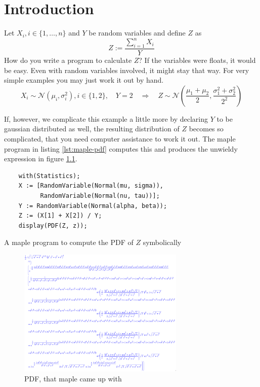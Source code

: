 \documentclass[11pt,a4paper]{book}
\begin{document}
\cleardoublepage

\tableofcontents

\cleardoublepage

\mainmatter
\pagestyle{fancy}

\chapter{Introduction}

Let $X_{i}, i \in \{ 1, \dots, n \}$ and $Y$ be random variables and define $Z$ as
\begin{equation*}
  Z := \frac{\sum_{i = 1}^{n} X_{i}}{Y}
\end{equation*}
How do you write a program to calculate $Z$? If the variables were floats, it
would be easy. Even with random variables involved, it might stay that way. For
very simple examples you may just work it out by hand.
\begin{equation*}
  X_{i} \sim \mathcal{N}(\mu_{i}, \sigma_{i}^{2}), i \in \{ 1, 2 \}, \quad Y = 2 \quad \Rightarrow \quad Z \sim \mathcal{N}\left( \frac{\mu_{1} + \mu_{2}}{2}, \frac{\sigma_{1}^{2} + \sigma_{2}^{2}}{2^{2}} \right)
\end{equation*}

If, however, we complicate this example a little more by declaring $Y$ to be
gaussian distributed as well, the resulting distribution of $Z$ becomes so
complicated, that you need computer assistance to work it out. The maple program
in listing \ref{lst:maple-pdf} computes this and produces the unwieldy
expression in figure \ref{fig:maple-pdf}.
\begin{listing}
  \begin{verbatim}
    with(Statistics);
    X := [RandomVariable(Normal(mu, sigma)),
          RandomVariable(Normal(nu, tau))];
    Y := RandomVariable(Normal(alpha, beta));
    Z := (X[1] + X[2]) / Y;
    display(PDF(Z, z));
  \end{verbatim}
  \caption{A maple program to compute the PDF of $Z$ symbolically}
  \label{lst:maple-pdf}
\end{listing}
\begin{figure}
  \centering
  \includegraphics[width=300px]{thesis/maple-pdf}
  \caption{PDF, that maple came up with}
  \label{fig:maple-pdf}
\end{figure}
\end{document}
